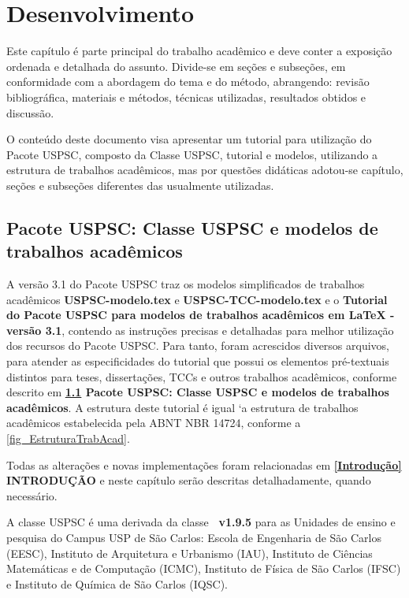 

\chapter{Desenvolvimento}\label{cap_exemplos}
Este capítulo \'e parte principal do trabalho acad\^emico e deve conter a exposição ordenada e detalhada do assunto. Divide-se em seções e subseções, em conformidade com a abordagem do tema e do m\'etodo, abrangendo: revisão bibliogr\'afica, materiais e m\'etodos, t\'ecnicas utilizadas, resultados obtidos e discussão.

O conteúdo deste documento visa apresentar um tutorial para utilização do Pacote USPSC, composto da Classe USPSC, tutorial e modelos, utilizando a estrutura de trabalhos acad\^emicos, mas por questões did\'aticas adotou-se capítulo, seções e subseções diferentes das usualmente utilizadas.


\section{Pacote USPSC: Classe USPSC e modelos de trabalhos acad\^emicos}\label{Pacote}
A versão 3.1 do Pacote USPSC traz os modelos simplificados de trabalhos acad\^emicos \textbf{USPSC-modelo.tex} e \textbf{USPSC-TCC-modelo.tex} e o \textbf{Tutorial do Pacote USPSC para modelos de trabalhos acad\^emicos em LaTeX - vers\~ao 3.1}, contendo as instruções precisas e detalhadas para melhor utilização dos recursos do Pacote USPSC. Para tanto, foram acrescidos diversos arquivos, para atender as especificidades do tutorial que possui os elementos pr\'e-textuais distintos para teses, dissertações, TCCs e outros trabalhos acad\^emicos, conforme descrito em  \textbf{\ref{Pacote} Pacote USPSC: Classe USPSC e modelos de trabalhos acad\^emicos}. A estrutura deste tutorial \'e igual `a estrutura de trabalhos acad\^emicos estabelecida pela ABNT NBR 14724, conforme a \autoref{fig_EstruturaTrabAcad}.

Todas as alterações e novas implementações foram relacionadas em \textbf{\ref{Introdução} INTRODUÇÃO} e neste capítulo serão descritas detalhadamente, quando necess\'ario. 

A classe USPSC \'e uma derivada da classe \textbf{\abnTeX\ v1.9.5} para as Unidades de ensino e pesquisa do Campus USP de São Carlos:
Escola de Engenharia de São Carlos (EESC), Instituto de Arquitetura e Urbanismo (IAU), Instituto de Ci\^encias Matem\'aticas e de Computação (ICMC), Instituto de Física de São Carlos (IFSC) e Instituto de Química de São Carlos (IQSC).

